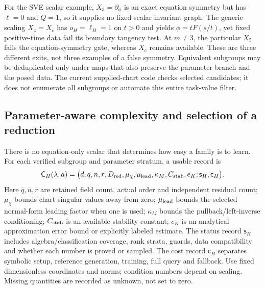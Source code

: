 \documentclass[11pt]{article}
\theoremstyle{definition}
\begin{document}
For the SVE scalar example, $X_3=\partial_\phi$ is an exact equation symmetry
but has $\ell=0$ and $Q=1$, so it supplies no fixed scalar invariant graph.
The generic scaling $X_4=X_c$ has $o_H=\ell_H=1$ on $t>0$ and yields
$\phi=tF(s/t)$, yet fixed positive-time data fail its boundary tangency test.
At $m\ne3$, the particular $X_5$ fails the equation-symmetry gate, whereas
$X_c$ remains available. These are three different exits, not three examples
of a false symmetry. Equivalent subgroups may be deduplicated only under maps
that also preserve the parameter branch and the posed data. The current
supplied-chart code checks selected candidates; it does not enumerate all
subgroups or automate this entire task-value filter.

\subsection{Parameter-aware complexity and selection of a reduction}
\label{sec:selection-core}
There is no equation-only scalar that determines how easy a family is to
learn. For each verified subgroup and parameter stratum, a usable record is
\begin{equation}
 \mathsf C_H(\lambda,a)=
 \bigl(d,\bar q,\bar n,\bar r,D_{\rm red},
       \mu_\chi,\mu_{\rm lead},\kappa_M,C_{\rm stab},
       e_K;\mathsf s_H,\mathsf c_H\bigr).
 \label{eq:complexity-record}
\end{equation}
Here $\bar q,\bar n,\bar r$ are retained field count, actual order and
independent residual count; $\mu_\chi$ bounds chart singular values away
from zero; $\mu_{\rm lead}$ bounds the selected normal-form leading factor
when one is used; $\kappa_M$ bounds the pullback/left-inverse conditioning;
$C_{\rm stab}$ is an available stability constant; $e_K$ is an analytical
approximation error bound or explicitly labeled estimate. The status record
$\mathsf s_H$ includes algebra/classification coverage, rank strata, guards,
data compatibility and whether each number is proved or sampled.
The cost record $\mathsf c_H$ separates symbolic setup, reference generation,
training, full query and fallback. Use fixed dimensionless coordinates and
norms; condition numbers depend on scaling. Missing quantities are recorded
as unknown, not set to zero.
\end{document}

